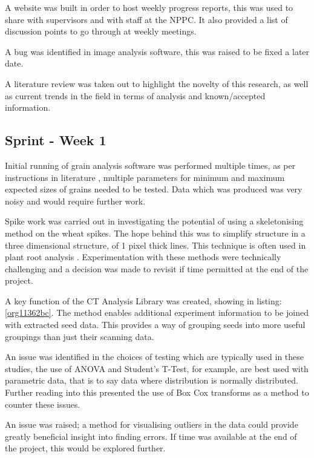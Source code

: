 \documentclass[11pt]{report}
\begin{document}
A website was built in order to host weekly progress reports, this was used to share with supervisors and with staff at the NPPC. It also provided a list of discussion points to go through at weekly meetings.

A bug was identified in image analysis software, this was raised to be fixed a later date.

A literature review was taken out to highlight the novelty of this research, as well as current trends in the field in terms of analysis and known/accepted information.

\subsection{Sprint - Week 1}
\label{sec:org4c1557a}

Initial running of grain analysis software was performed multiple times, as per instructions in literature \cite{Hughes2017}, multiple parameters for minimum and maximum expected sizes of grains needed to be tested. Data which was produced was very noisy and would require further work.

Spike work was carried out in investigating the potential of using a skeletonising method on the wheat spikes. The hope behind this was to simplify structure in a three dimensional structure, of 1 pixel thick lines. This technique is often used in plant root analysis \cite{Mairhofer2015,Daly2017}. Experimentation with these methods were technically challenging and a decision was made to revisit if time permitted at the end of the project.

A key function of the CT Analysis Library was created, showing in listing:\ref{org11362bc}. The method enables additional experiment information to be joined with extracted seed data. This provides a way of grouping seeds into more useful groupings than just their scanning data.

An issue was identified in the choices of testing which are typically used in these studies, the use of ANOVA and Student's T-Test, for example, are best used with parametric data, that is to say data where distribution is normally distributed. Further reading into this presented the use of Box Cox transforms as a method to counter these issues.

An issue was raised; a method for visualising outliers in the data could provide greatly beneficial insight into finding errors. If time was available at the end of the project, this would be explored further.
\end{document}
